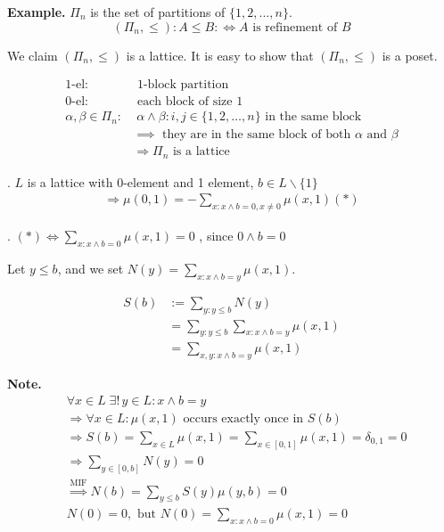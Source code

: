 \textbf{Example.}
$\Pi_n$ is the set of partitions of $\{1,2,..., n\}$. 
\[
    (\Pi_n, \leq): A \leq B: \iff \text{$A$ is refinement of $B$}
\]

We claim $(\Pi_n, \leq)$ is a lattice. 
It is easy to show that $(\Pi_n, \leq)$ is a poset. 

\begin{align*}
  \text{1-el}: & \text{ 1-block partition} \\
  \text{0-el}: & \text{ each block of size 1} \\
  \alpha, \beta \in \Pi_n: & \;\alpha \wedge \beta: i,j \in \{1,2,\ldots,n\} 
    \text{ in the same block } \\
    & \implies \text{ they are in the same block of both $\alpha$ and $\beta$} \\
  &\Rightarrow \Pi_n \text{ is a lattice}
\end{align*}

\Theorem.
$L$ is a lattice with 0-element and 1 element, $b \in L\backslash \{1\}$
\begin{align*}
    \Rightarrow \mu(0,1) = -\sum_{x: x\wedge b = 0, x \neq 0} \mu(x,1) (*)
\end{align*}

\Proof.
$(*) \Leftrightarrow \sum_{x: x\wedge b = 0} \mu(x,1) = 0$
, since $0 \wedge b = 0$

Let $y \leq b$, and we set $N(y) = \sum_{x: x\wedge b=y} \mu(x,1)$.

\begin{align*}
  S(b) &:= \sum_{y: y \leq b} N(y) \\
    & = \sum_{y: y \leq b} \sum_{x: x\wedge b=y} \mu(x,1) \\
    & = \sum_{x,y: x \wedge b = y} \mu(x,1)
\end{align*}

\textbf{Note.}
\begin{align*}
  &\forall x \in L \; \exists!\, y \in L : x \wedge b = y \\
  &\Rightarrow \forall x \in L: \mu(x,1) \text{ occurs exactly once in $S(b)$} \\
  &\Rightarrow S(b) = \sum_{x \in L} \mu(x,1) = \sum_{x \in [0,1]} \mu(x,1) = \delta_{0,1} = 0 \\
  &\Rightarrow \sum_{y \in [0,b]} N(y) = 0 \\
  &\stackrel{\text{MIF}}{\Rightarrow} N(b) = \sum_{y \leq b} S(y) \mu(y,b) = 0\\
  &N(0) = 0, \text{ but } N(0) = \sum_{x:x \wedge b = 0} \mu(x,1) = 0 \\
\end{align*}

